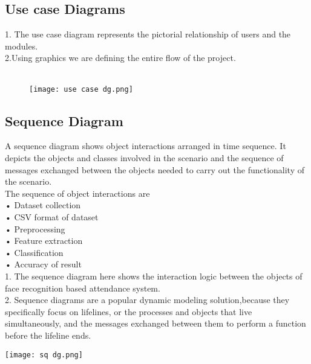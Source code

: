 \documentclass[12pt,a4paper]{report}
\begin{document}
\subsection{\Large Use case Diagrams}
1. The use case diagram represents the pictorial relationship of users and the modules.\\
2.Using graphics we are defining the entire flow of the project.\\ \\
\begin{figure}[htp]
    \centering
    \texttt{[image: use case dg.png]}
    \caption{}
    \label{fig:galaxy}
\end{figure}

\subsection{\large Sequence Diagram}
A sequence diagram shows object interactions arranged in time sequence. It depicts the objects and classes involved in the scenario and the sequence of messages exchanged between the objects needed to carry out the functionality of the scenario.\\
The sequence of object interactions are\\
• Dataset collection\\
• CSV format of dataset\\
• Preprocessing\\
• Feature extraction\\
• Classification\\
• Accuracy of result\\
1. The sequence diagram here shows the interaction logic between the objects of face recognition based attendance system.\\
2. Sequence diagrams are a popular dynamic modeling solution,because they specifically focus on lifelines, or the processes and objects that live simultaneously, and the messages exchanged between them to perform a function before the lifeline ends.
\begin{center}
\texttt{[image: sq dg.png]}
\begin{figure}[h!]
\caption{}
\end{figure}
\end{center}
\end{document}

